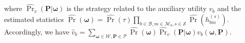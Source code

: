 \documentclass[conference]{IEEEtran}
\begin{document}
%
where $\hat{\Pr}_v(\mathbf{P}|  \boldsymbol{\omega})$ is the strategy related to the auxiliary utility $v_b$ and the estimated statistics  {$\hat{\Pr}(\boldsymbol{\omega})=\hat{\Pr}(\tau)\prod_{b\in\mathcal{B},m\in\mathcal{M}_b,s\in\mathcal{S}}\hat{\Pr}(h_{bm}^{(s)})$}. Accordingly, we have {$\hat{v}_b=\sum_{\boldsymbol{\omega}\in\mathcal{W},\mathbf{P}\in\mathcal{P}}  \hat{\Pr}(\boldsymbol{\omega})\hat{\Pr}_v(\mathbf{P}|  \boldsymbol{\omega})v_{b}(\boldsymbol{\omega},\mathbf{P})$}.
\end{document}
